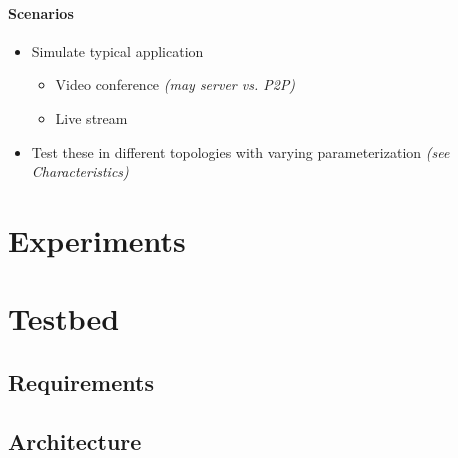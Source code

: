 \paragraph{Scenarios} %
\label{par:Scenarios}
\begin{itemize}
    \item Simulate typical application
    \begin{itemize}
        \item Video conference \textit{(may server vs. P2P)}
        \item Live stream
    \end{itemize}
    \item Test these in different topologies with varying parameterization
        \textit{(see Characteristics)}
\end{itemize}


\section{Experiments} %
\label{sec:Experiments}



\section{Testbed} %
\label{sec:Testbed_Design}

\subsection{Requirements} %
\label{sub:Requirements}


\subsection{Architecture} %
\label{sub:Architecture}




